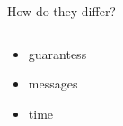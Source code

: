 \documentclass[aspectratio=43]{beamer}
\begin{document}
\begin{frame}{How do they differ?}
	\begin{columns}
		\begin{column}{0.6\textwidth}
			\begin{itemize}
				\item guarantess
                                \item messages
                                \item time
			\end{itemize}
		\end{column}
		\begin{column}{0.4\textwidth}
			\centering
		\end{column}
	\end{columns}
\end{frame}

%                            

\end{document}
